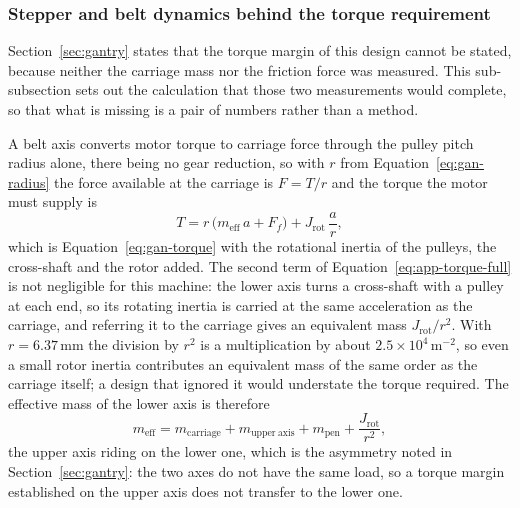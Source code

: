 \subsubsection{Stepper and belt dynamics behind the torque requirement}
\label{sec:app-hw-torque}

Section~\ref{sec:gantry} states that the torque margin of this design cannot be stated, because neither the carriage mass nor the friction force was measured.
This sub-subsection sets out the calculation that those two measurements would complete, so that what is missing is a pair of numbers rather than a method.

A belt axis converts motor torque to carriage force through the pulley pitch radius alone, there being no gear reduction, so with $r$ from Equation~\ref{eq:gan-radius} the force available at the carriage is $F=T/r$ and the torque the motor must supply is
\begin{equation}
T=r\,\bigl(m_{\mathrm{eff}}\,a+F_f\bigr)+J_{\mathrm{rot}}\,\frac{a}{r},
\label{eq:app-torque-full}
\end{equation}
which is Equation~\ref{eq:gan-torque} with the rotational inertia of the pulleys, the cross-shaft and the rotor added.
The second term of Equation~\ref{eq:app-torque-full} is not negligible for this machine: the lower axis turns a cross-shaft with a pulley at each end, so its rotating inertia is carried at the same acceleration as the carriage, and referring it to the carriage gives an equivalent mass $J_{\mathrm{rot}}/r^2$.
With $r=6.37$\,mm the division by $r^2$ is a multiplication by about $2.5\times10^{4}$\,m$^{-2}$, so even a small rotor inertia contributes an equivalent mass of the same order as the carriage itself; a design that ignored it would understate the torque required.
The effective mass of the lower axis is therefore
\begin{equation}
m_{\mathrm{eff}}=m_{\mathrm{carriage}}+m_{\mathrm{upper\ axis}}+m_{\mathrm{pen}}+\frac{J_{\mathrm{rot}}}{r^{2}},
\label{eq:app-meff}
\end{equation}
the upper axis riding on the lower one, which is the asymmetry noted in Section~\ref{sec:gantry}: the two axes do not have the same load, so a torque margin established on the upper axis does not transfer to the lower one.

